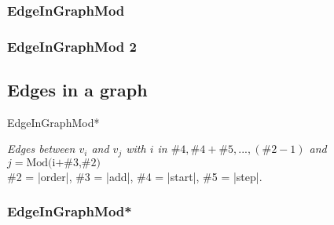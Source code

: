\subsubsection{EdgeInGraphMod}
\begin{center}
\begin{tkzexample}
\end{tkzexample}
\end{center}

\subsubsection{EdgeInGraphMod 2}
\begin{center}
\begin{tkzexample}
\end{tkzexample}
\end{center}
 
\newpage
\subsection{Edges in a graph  }
\begin{NewMacroBox}{EdgeInGraphMod*}{}

\medskip
\emph{Edges between $v_i$ and $v_j$ with $i$ in $\#4,\#4+\#5,...,(\text{\#2}-1)$  and $j=\text{Mod(i+\#3,\#2)}$}\\
\#2 = |order|,  \#3 = |add|, \#4 = |start|, \#5 = |step|.\\
\end{NewMacroBox} 

\subsubsection{EdgeInGraphMod*}
\begin{center}
\begin{tkzexample}
\end{tkzexample}
\end{center}

